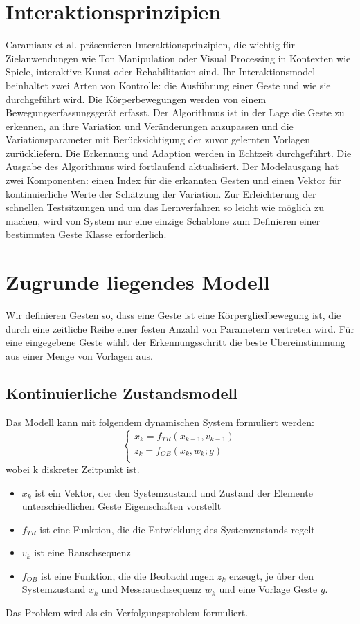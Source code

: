 \documentclass{llncs}
\begin{document}
\section{Interaktionsprinzipien}
Caramiaux et al.\cite{Caramiaux2014} präsentieren Interaktionsprinzipien, die wichtig für Zielanwendungen wie Ton Manipulation oder Visual Processing in Kontexten wie Spiele, interaktive Kunst oder Rehabilitation sind. Ihr Interaktionsmodel beinhaltet zwei Arten von Kontrolle: die Ausführung einer Geste und wie sie durchgeführt wird. Die Körperbewegungen werden von einem Bewegungserfassungsgerät erfasst. Der Algorithmus ist in der Lage die Geste zu erkennen, an ihre  Variation und Veränderungen anzupassen und die Variationsparameter mit Berücksichtigung der zuvor gelernten Vorlagen zurückliefern. Die Erkennung und Adaption werden in Echtzeit durchgeführt. Die Ausgabe des Algorithmus wird fortlaufend aktualisiert. Der Modelausgang hat zwei Komponenten:  einen Index für die erkannten Gesten und einen Vektor für kontinuierliche Werte der Schätzung der Variation. Zur Erleichterung der schnellen Testsitzungen und um das Lernverfahren so leicht wie möglich zu machen, wird von System nur eine einzige Schablone zum Definieren einer bestimmten Geste Klasse erforderlich.

\section{Zugrunde liegendes Modell}
Wir definieren Gesten so, dass eine Geste ist eine Körpergliedbewegung ist, die durch eine zeitliche Reihe einer festen Anzahl von Parametern vertreten wird. Für eine eingegebene Geste wählt der Erkennungsschritt die beste Übereinstimmung aus einer Menge von Vorlagen aus.
\subsection{ Kontinuierliche Zustandsmodell}
Das Modell kann mit folgendem dynamischen System formuliert werden:
\begin{equation}
\left\{\begin{array}{l}
x_k = f_{TR} (x_{k-1}, v_{k-1}) \\
z_k = f_{OB} (x_k, w_k; g) \\
\end{array}\right.
\end{equation} 										
wobei k diskreter Zeitpunkt ist.
\begin{itemize}
	\item $x_k$ ist ein Vektor, der den Systemzustand und Zustand der Elemente unterschiedlichen Geste Eigenschaften vorstellt
	\item $f_{TR}$ ist eine Funktion, die die Entwicklung des Systemzustands regelt
	\item $v_k$ ist eine Rauschsequenz
	\item $f_{OB}$ ist eine Funktion, die die Beobachtungen $z_k$ erzeugt, je über den Systemzustand $x_k$ und Messrauschsequenz $w_k$ und eine Vorlage Geste $g$.
\end{itemize}
Das Problem wird als ein Verfolgungsproblem formuliert.
\end{document}
